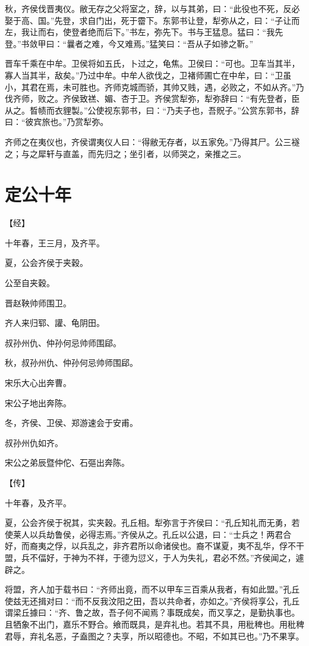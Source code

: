 \documentclass[a4paper,12pt,UTF8,twoside]{ctexbook}
\begin{document}
秋，齐侯伐晋夷仪。敝无存之父将室之，辞，以与其弟，曰：“此役也不死，反必娶于高、国。”先登，求自门出，死于霤下。东郭书让登，犁弥从之，曰：“子让而左，我让而右，使登者绝而后下。”书左，弥先下。书与王猛息。猛曰：“我先登。”书敛甲曰：“曩者之难，今又难焉。”猛笑曰：“吾从子如骖之靳。”

晋车千乘在中牟。卫侯将如五氏，卜过之，龟焦。卫侯曰：“可也。卫车当其半，寡人当其半，敌矣。”乃过中牟。中牟人欲伐之，卫褚师圃亡在中牟，曰：“卫虽小，其君在焉，未可胜也。齐师克城而骄，其帅又贱，遇，必败之，不如从齐。”乃伐齐师，败之。齐侯致禚、媚、杏于卫。齐侯赏犁弥，犁弥辞曰：“有先登者，臣从之。晳帻而衣貍製。”公使视东郭书，曰：“乃夫子也，吾貺子。”公赏东郭书，辞曰：“彼宾旅也。”乃赏犁弥。

齐师之在夷仪也，齐侯谓夷仪人曰：“得敝无存者，以五家免。”乃得其尸。公三襚之；与之犀轩与直盖，而先归之；坐引者，以师哭之，亲推之三。


\section{定公十年}



【经】

十年春，王三月，及齐平。

夏，公会齐侯于夹穀。

公至自夹穀。

晋赵鞅帅师围卫。

齐人来归郓、讙、龟阴田。

叔孙州仇、仲孙何忌帅师围郈。

秋，叔孙州仇、仲孙何忌帅师围郈。

宋乐大心出奔曹。

宋公子地出奔陈。

冬，齐侯、卫侯、郑游速会于安甫。

叔孙州仇如齐。

宋公之弟辰暨仲佗、石彄出奔陈。

【传】

十年春，及齐平。

夏，公会齐侯于祝其，实夹穀。孔丘相。犁弥言于齐侯曰：“孔丘知礼而无勇，若使莱人以兵劫鲁侯，必得志焉。”齐侯从之。孔丘以公退，曰：“士兵之！两君合好，而裔夷之俘，以兵乱之，非齐君所以命诸侯也。裔不谋夏，夷不乱华，俘不干盟，兵不偪好，于神为不祥，于德为愆义，于人为失礼，君必不然。”齐侯闻之，遽辟之。

将盟，齐人加于载书曰：“齐师出竟，而不以甲车三百乘从我者，有如此盟。”孔丘使兹无还揖对曰：“而不反我汶阳之田，吾以共命者，亦如之。”齐侯将享公，孔丘谓梁丘據曰：“齐、鲁之故，吾子何不闻焉？事既成矣，而又享之，是勤执事也。且牺象不出门，嘉乐不野合。飨而既具，是弃礼也。若其不具，用秕稗也。用秕稗君辱，弃礼名恶，子盍图之？夫享，所以昭德也。不昭，不如其已也。”乃不果享。
\end{document}
